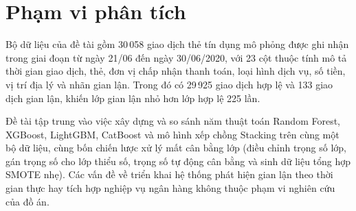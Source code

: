 \section{Phạm vi phân tích}
Bộ dữ liệu của đề tài gồm 30\,058 giao dịch thẻ tín dụng mô phỏng được ghi nhận trong giai đoạn từ ngày 21/06 đến ngày 30/06/2020, với 23 cột thuộc tính mô tả thời gian giao dịch, thẻ, đơn vị chấp nhận thanh toán, loại hình dịch vụ, số tiền, vị trí địa lý và nhãn gian lận. Trong đó có 29\,925 giao dịch hợp lệ và 133 giao dịch gian lận, khiến lớp gian lận nhỏ hơn lớp hợp lệ 225 lần.

Đề tài tập trung vào việc xây dựng và so sánh năm thuật toán Random Forest, XGBoost, LightGBM, CatBoost và mô hình xếp chồng Stacking trên cùng một bộ dữ liệu, cùng bốn chiến lược xử lý mất cân bằng lớp (điều chỉnh trọng số lớp, gán trọng số cho lớp thiểu số, trọng số tự động cân bằng và sinh dữ liệu tổng hợp SMOTE nhẹ). Các vấn đề về triển khai hệ thống phát hiện gian lận theo thời gian thực hay tích hợp nghiệp vụ ngân hàng không thuộc phạm vi nghiên cứu của đồ án.